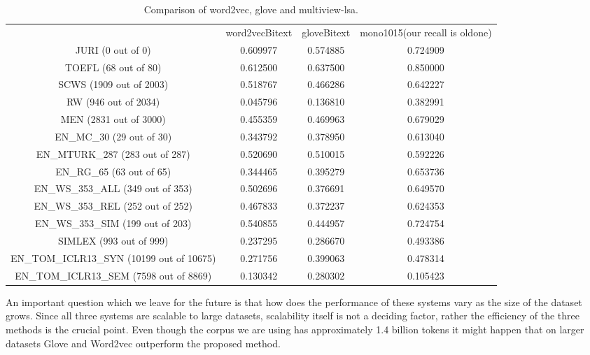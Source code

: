 \documentclass[11pt]{article}
\begin{document}
\begin{table*}[htbp]
  \centering
  \begin{tabular}{cccc}
                                     & word2vecBitext &  gloveBitext &  mono1015(our recall is oldone)\\
JURI (0 out of 0)                    &  0.609977      &     0.574885 &  0.724909 \\
TOEFL (68 out of 80)                 &  0.612500      &     0.637500 &  0.850000 \\
SCWS (1909 out of 2003)              &  0.518767      &     0.466286 &  0.642227 \\
RW (946 out of 2034)                 &  0.045796      &     0.136810 &  0.382991 \\
MEN (2831 out of 3000)               &  0.455359      &     0.469963 &  0.679029 \\
EN\_MC\_30 (29 out of 30)            &  0.343792      &     0.378950 &  0.613040 \\
EN\_MTURK\_287 (283 out of 287)      &  0.520690      &     0.510015 &  0.592226 \\
EN\_RG\_65 (63 out of 65)            &  0.344465      &     0.395279 &  0.653736 \\
EN\_WS\_353\_ALL (349 out of 353)    &  0.502696      &     0.376691 &  0.649570 \\
EN\_WS\_353\_REL (252 out of 252)    &  0.467833      &     0.372237 &  0.624353 \\
EN\_WS\_353\_SIM (199 out of 203)    &  0.540855      &     0.444957 &  0.724754 \\
SIMLEX (993 out of 999)              &  0.237295      &     0.286670 &  0.493386 \\
EN\_TOM\_ICLR13\_SYN (10199 out of 10675) & 0.271756  &     0.399063 &  0.478314 \\
EN\_TOM\_ICLR13\_SEM (7598 out of 8869)   &  0.130342 &    0.280302  &  0.105423 \\
  \end{tabular}
  \caption{Comparison of word2vec, glove and multiview-lsa.}
  \label{tab:comparison}
\end{table*}


An important question which we leave for the future is that how does
the performance of these systems vary as the size of the dataset
grows. Since all three systems are scalable to large datasets,
scalability itself is not a deciding factor, rather the efficiency of
the three methods is the crucial point. Even though the corpus we are
using has approximately 1.4 billion tokens it might happen that on
larger datasets Glove and Word2vec outperform the proposed method. 
\end{document}
